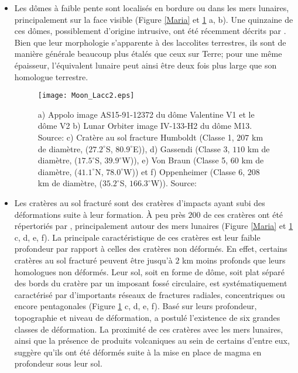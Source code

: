 \begin{itemize}
\item Les dômes  à faible pente sont localisés en  bordure ou dans les
  mers   lunaires,  principalement   sur  la   face  visible   (Figure
  \ref{Maria}  et \ref{C1-Moon-magma}  a,  b).  Une  quinzaine de  ces
  dômes, possiblement  d'origine intrusive, ont été  récemment décrits
  par \citet{Wohler:2007it}.  Bien que  leur morphologie s'apparente à
  des  laccolites terrestres,  ils sont  de manière  générale beaucoup
  plus  étalés   que  ceux  sur   Terre;  pour  une   même  épaisseur,
  l'équivalent lunaire  peut ainsi être  deux fois plus large  que son
  homologue terrestre.

  \begin{figure}[htpb]
    \begin{center}
      \graphicspath{ {/Users/thorey/Documents/These/Manuscript/Figure/Chapter1/} }
      \texttt{[image: Moon\_Lacc2.eps]}
      \caption{a) Appolo  image AS15-91-12372 du dôme  Valentine V1 et
        le  dôme  V2   b)  Lunar  Orbiter  image   IV-133-H2  du  dôme
        M13. Source: \citet{Wohler:2009jj} c)  Cratère au sol fracture
        Humboldt  (Classe 1,  $207$  km  de diamètre,  ($27.2^\circ$S,
        $80.9^\circ$E)), d) Gassendi (Classe  3, $110$ km de diamètre,
        ($17.5^\circ$S, $39.9^\circ$W)), e) Von  Braun (Classe 5, $60$
        km   de  diamètre,   ($41.1^\circ$N,  $78.0^\circ$W))   et  f)
        Oppenheimer (Classe  6, $208$ km de  diamètre, ($35.2^\circ$S,
        $166.3^\circ$W)). Source: \citet{Jozwiak:2015iy}}
      \label{C1-Moon-magma}
    \end{center}
  \end{figure}

\item Les cratères  au sol fracturé sont des  cratères d'impacts ayant
  subi des déformations suite à leur  formation.  À peu près $ 200$ de
  ces  cratères   ont  été  répertoriés   par  \citet{Schultz:1976kt},
  principalement  autour  des  mers lunaires  (Figure  \ref{Maria}  et
  \ref{C1-Moon-magma} c,  d, e, f).  La  principale caractéristique de
  ces cratères  est leur  faible profondeur par  rapport à  celles des
  cratères non déformés.  En effet,  certains cratères au sol fracturé
  peuvent être jusqu'à $2$ km  moins profonds que leurs homologues non
  déformés.  Leur  sol, soit en  forme de  dôme, soit plat  séparé des
  bords   du   cratère  par   un   imposant   fossé  circulaire,   est
  systématiquement caractérisé  par d'importants réseaux  de fractures
  radiales,    concentriques    ou   encore    pentagonales    (Figure
  \ref{C1-Moon-magma}  c,  d,  e,  f).   Basé  sur  leurs  profondeur,
  topographie  et  niveau  de  déformation,  \citet{Schultz:1976kt}  a
  postulé  l'existence  de six  grandes  classes  de déformation.   La
  proximité  de ces  cratères avec  les  mers lunaires,  ainsi que  la
  présence de  produits volcaniques au  sein de certains  d'entre eux,
  suggère qu'ils ont été déformés suite à la mise en place de magma en
  profondeur sous leur sol.
\end{itemize}

